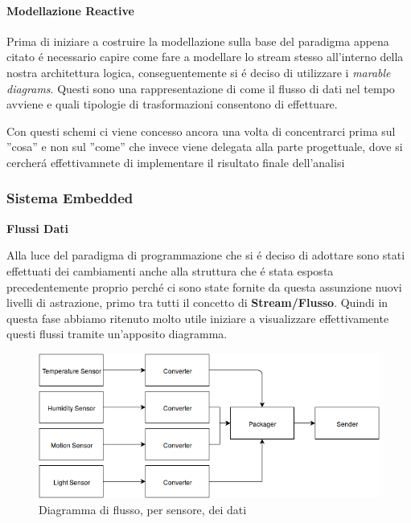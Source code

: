 \paragraph{Modellazione Reactive}

Prima di iniziare a costruire la modellazione sulla base del paradigma appena citato \'e necessario capire come fare a modellare lo stream stesso all'interno della nostra architettura logica, conseguentemente si \'e deciso di utilizzare i \textit{marable diagrams}. Questi sono una rappresentazione di come il flusso di dati nel tempo avviene e quali tipologie di trasformazioni consentono di effettuare.

Con questi schemi ci viene concesso ancora una volta di concentrarci prima sul ''cosa'' e non sul ''come'' che invece viene delegata alla parte progettuale, dove si cercher\'a effettivamnete di implementare il risultato finale dell'analisi

\subsubsection{Sistema Embedded}

\begin{center}
  \textbf{Flussi Dati}
\end{center}

Alla luce del paradigma di programmazione che si \'e deciso di adottare sono stati effettuati dei cambiamenti anche alla struttura che \'e stata esposta precedentemente proprio perch\'e ci sono state fornite da questa assunzione nuovi livelli di astrazione, primo tra tutti il concetto di \textbf{Stream/Flusso}. Quindi in questa fase abbiamo ritenuto molto utile iniziare a visualizzare effettivamente questi flussi tramite un'apposito diagramma.

\begin{figure}[ht]
\centering
\includegraphics[width=\textwidth]{Figures/LogicArchitecture/EmbeddedSystem/FlowDiagram}
\caption{Diagramma di flusso, per sensore, dei dati}
\end{figure}


